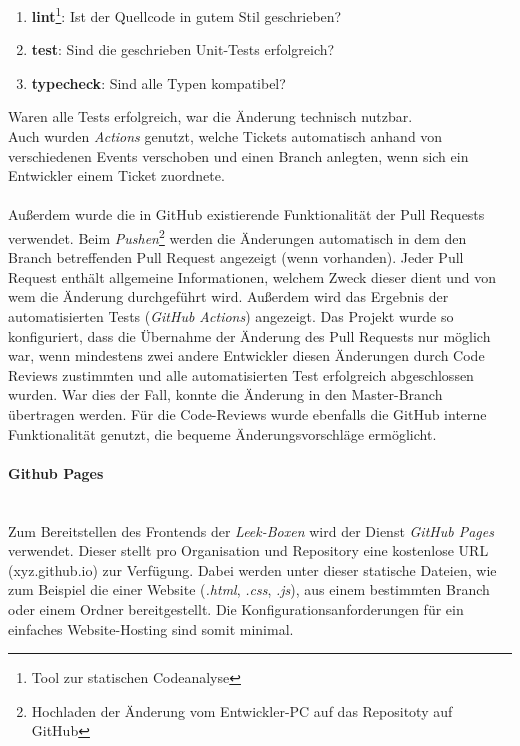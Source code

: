 \documentclass[10pt, a4paper]{article}
\begin{document}
\begin{onehalfspace}
\begin{enumerate}
        \item \textbf{lint}\footnote{Tool zur statischen Codeanalyse}: Ist der Quellcode in gutem Stil geschrieben?
        \item \textbf{test}: Sind die geschrieben Unit-Tests erfolgreich?
        \item \textbf{typecheck}: Sind alle Typen kompatibel?
      \end{enumerate}
      Waren alle Tests erfolgreich, war die Änderung technisch nutzbar. \\
      Auch wurden \textit{Actions} genutzt, welche Tickets automatisch anhand von verschiedenen Events verschoben und einen Branch anlegten, wenn sich ein Entwickler einem Ticket zuordnete.
      \\~\\
      Außerdem wurde die in GitHub existierende Funktionalität der Pull Requests verwendet. Beim \textit{Pushen}\footnote{Hochladen der Änderung vom Entwickler-PC auf das Repositoty auf GitHub}
      werden die Änderungen automatisch in dem den Branch betreffenden Pull Request angezeigt (wenn vorhanden).
      Jeder Pull Request enthält allgemeine Informationen, welchem Zweck dieser dient und von wem die Änderung durchgeführt wird. Außerdem wird das Ergebnis der automatisierten Tests (\textit{GitHub Actions}) angezeigt.
      Das Projekt wurde so konfiguriert, dass die Übernahme der Änderung des Pull Requests nur möglich war, wenn mindestens zwei andere Entwickler diesen Änderungen
      durch Code Reviews zustimmten und alle automatisierten Test erfolgreich abgeschlossen wurden. War dies der Fall, konnte die Änderung in den Master-Branch übertragen werden.
      Für die Code-Reviews wurde ebenfalls die GitHub interne Funktionalität genutzt, die bequeme Änderungsvorschläge ermöglicht.

      \paragraph{Github Pages} $~$ \\
      Zum Bereitstellen des Frontends der \textit{Leek-Boxen} wird der Dienst \textit{GitHub Pages} verwendet. Dieser stellt pro Organisation und Repository eine kostenlose URL (xyz.github.io) zur Verfügung.
      Dabei werden unter dieser statische Dateien, wie zum Beispiel die einer Website (\textit{.html}, \textit{.css}, \textit{.js}), aus einem bestimmten Branch oder einem Ordner bereitgestellt.
      Die Konfigurationsanforderungen für ein einfaches Website-Hosting sind somit minimal.


\end{onehalfspace}
\end{document}
